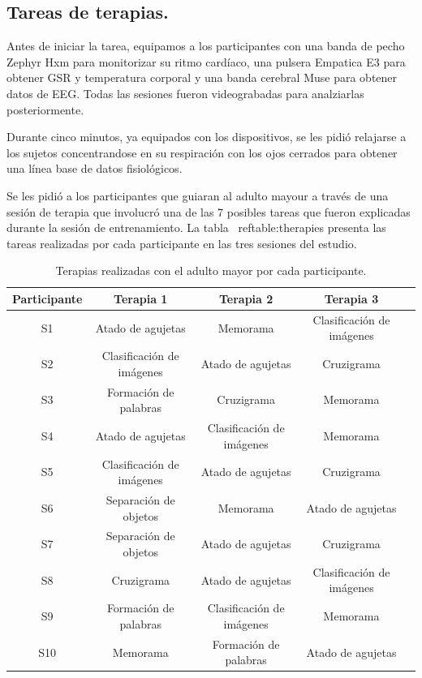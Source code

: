 \subsection{Tareas de terapias.}\label{secc:therapytasks}
Antes de iniciar la tarea, equipamos a los participantes con una banda de pecho Zephyr Hxm para monitorizar su ritmo card\'iaco, una pulsera Empatica E3 para obtener GSR y temperatura corporal y una banda cerebral Muse para obtener datos de EEG. Todas las sesiones fueron videograbadas para analziarlas posteriormente.

Durante cinco minutos, ya equipados con los dispositivos, se les pidi\'o relajarse a los sujetos concentrandose en su respiraci\'on con los ojos cerrados para obtener una l\'inea base de datos fisiol\'ogicos.

Se les pidi\'o a los participantes que guiaran al adulto mayour a trav\'es de una sesi\'on de terapia que involucr\'o una de las 7 posibles tareas que fueron explicadas durante la sesi\'on de entrenamiento. La tabla ~ref{table:therapies} presenta las tareas realizadas por cada participante en las tres sesiones del estudio.
\begin{table}[h]
\centering
\caption{Terapias realizadas con el adulto mayor por cada participante.}
\label{table:therapies}
\begin{tabular}{|c|c|c|c|c|}
\hline
 \textbf{Participante}&  \textbf{Terapia 1}& \textbf{Terapia 2}   & \textbf{Terapia 3}  \\ \hline
 S1&  Atado de agujetas& Memorama & Clasificaci\'on de im\'agenes   \\ \hline
 S2&  Clasificaci\'on de im\'agenes& Atado de agujetas & Cruzigrama   \\ \hline
 S3&  Formaci\'on de palabras& Cruzigrama & Memorama    \\ \hline
 S4&  Atado de agujetas& Clasificaci\'on de im\'agenes & Memorama   \\ \hline
 S5&  Clasificaci\'on de im\'agenes&  Atado de agujetas & Cruzigrama   \\ \hline
 S6&  Separaci\'on de objetos& Memorama & Atado de agujetas   \\ \hline
 S7&  Separaci\'on de objetos & Atado de agujetas & Cruzigrama   \\ \hline
 S8&  Cruzigrama& Atado de agujetas & Clasificaci\'on de im\'agenes   \\ \hline
 S9&  Formaci\'on de palabras& Clasificaci\'on de im\'agenes & Memorama   \\ \hline
 S10&  Memorama& Formaci\'on de palabras & Atado de agujetas   \\ \hline
\end{tabular}
\end{table}
